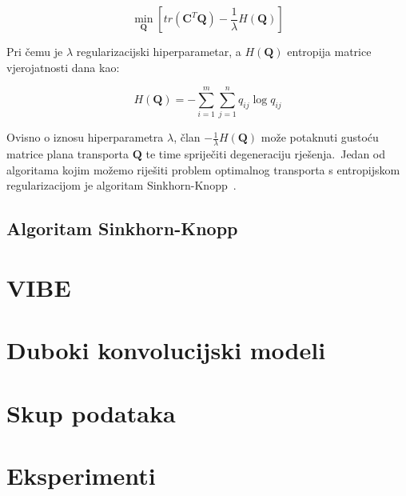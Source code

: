 \documentclass[diplomskirad]{fer}
\begin{document}
\begin{equation}
  \min_{\bm{Q}} \left[ tr(\bm{C}^T \bm{Q}) - \frac{1}{\lambda} H(\bm{Q}) \right]
  \label{eq:ot_with_entropy}
\end{equation}

Pri čemu je $\lambda$ regularizacijski hiperparametar, a $H(\bm{Q})$ entropija matrice vjerojatnosti dana kao:

\begin{equation}
  H(\bm{Q}) = -\sum_{i = 1}^{m} \sum_{j = 1}^{n} q_{ij} \log q_{ij}
  \label{eq:ot_with_entropy}
\end{equation}

Ovisno o iznosu hiperparametra $\lambda$, član $- \frac{1}{\lambda} H(\bm{Q})$ može potaknuti gustoću matrice plana transporta $\bm{Q}$ te time spriječiti degeneraciju rješenja.\
Jedan od algoritama kojim možemo riješiti problem optimalnog transporta s entropijskom regularizacijom je algoritam Sinkhorn-Knopp~\cite{knight2008sinkhorn}.\ 

\section{Algoritam Sinkhorn-Knopp}
\label{sek:sk_alg}

\chapter{VIBE}
\label{pog:vibe}

\chapter{Duboki konvolucijski modeli}
\label{pog:cnn}

\chapter{Skup podataka}
\label{pog:skup}


\chapter{Eksperimenti}
\label{pog:eksperimenti}
\end{document}
